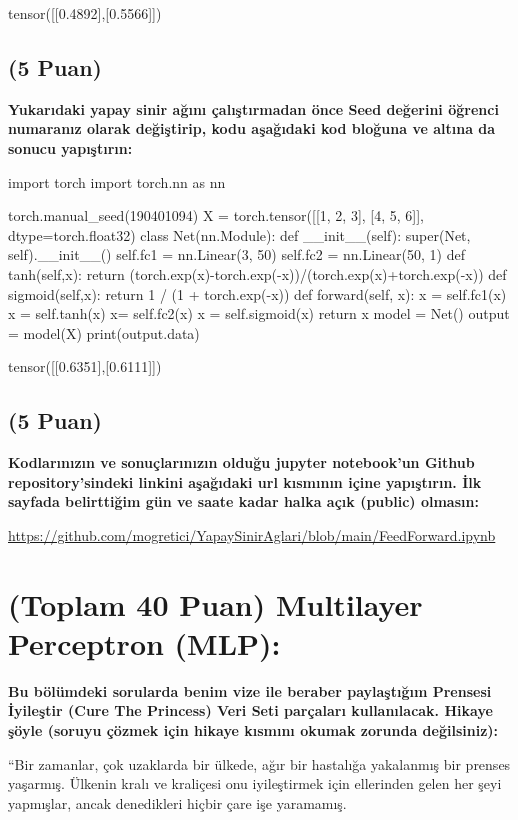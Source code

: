 \documentclass[11pt]{article}
\begin{document}
tensor([[0.4892],[0.5566]])
\subsection{(5 Puan)} \textbf{Yukarıdaki yapay sinir ağını çalıştırmadan önce Seed değerini öğrenci numaranız olarak değiştirip, kodu aşağıdaki kod bloğuna ve altına da sonucu yapıştırın:}

\begin{python}
import torch
import torch.nn as nn

torch.manual_seed(190401094)
X = torch.tensor([[1, 2, 3], [4, 5, 6]], dtype=torch.float32)
class Net(nn.Module):
    def __init__(self):
        super(Net, self).__init__()
        self.fc1 = nn.Linear(3, 50)
        self.fc2 = nn.Linear(50, 1)
    def tanh(self,x):
      return (torch.exp(x)-torch.exp(-x))/(torch.exp(x)+torch.exp(-x))
    def sigmoid(self,x):
      return 1 / (1 + torch.exp(-x))
    def forward(self, x):
        x = self.fc1(x)
        x = self.tanh(x)
        x= self.fc2(x)
        x = self.sigmoid(x)
        return x
model = Net()
output = model(X)
print(output.data)
\end{python}

tensor([[0.6351],[0.6111]])

\subsection{(5 Puan)} \textbf{Kodlarınızın ve sonuçlarınızın olduğu jupyter notebook'un Github repository'sindeki linkini aşağıdaki url kısmının içine yapıştırın. İlk sayfada belirttiğim gün ve saate kadar halka açık (public) olmasın:}

\url{https://github.com/mogretici/YapaySinirAglari/blob/main/FeedForward.ipynb}

\section{(Toplam 40 Puan) Multilayer Perceptron (MLP):} 
\textbf{Bu bölümdeki sorularda benim vize ile beraber paylaştığım Prensesi İyileştir (Cure The Princess) Veri Seti parçaları kullanılacak. Hikaye şöyle (soruyu çözmek için hikaye kısmını okumak zorunda değilsiniz):} 

``Bir zamanlar, çok uzaklarda bir ülkede, ağır bir hastalığa yakalanmış bir prenses yaşarmış. Ülkenin kralı ve kraliçesi onu iyileştirmek için ellerinden gelen her şeyi yapmışlar, ancak denedikleri hiçbir çare işe yaramamış.
\end{document}
